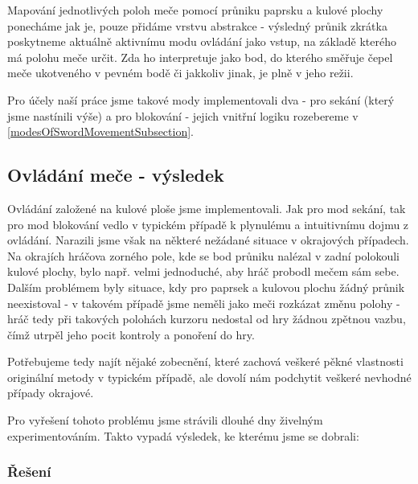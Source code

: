 Mapování jednotlivých poloh meče pomocí průniku paprsku a kulové plochy ponecháme jak je, pouze přidáme vrstvu abstrakce - výsledný průnik zkrátka poskytneme aktuálně aktivnímu modu ovládání jako vstup, na základě kterého má polohu meče určit. Zda ho interpretuje jako bod, do kterého směřuje čepel meče ukotveného v pevném bodě či jakkoliv jinak, je plně v jeho režii.

Pro účely naší práce jsme takové mody implementovali dva - pro sekání (který jsme nastínili výše) a pro blokování - jejich vnitřní logiku rozebereme v \ref{modesOfSwordMovementSubsection}.


\subsection{Ovládání meče - výsledek}

Ovládání založené na kulové ploše jsme implementovali. Jak pro mod sekání, tak pro mod blokování vedlo v typickém případě k plynulému a intuitivnímu dojmu z ovládání. Narazili jsme však na některé nežádané situace v okrajových případech. Na okrajích hráčova zorného pole, kde se bod průniku nalézal v zadní polokouli kulové plochy, bylo např. velmi jednoduché, aby hráč probodl mečem sám sebe. Dalším problémem byly situace, kdy pro paprsek a kulovou plochu žádný průnik neexistoval - v takovém případě jsme neměli jako meči rozkázat změnu polohy - hráč tedy při takových polohách kurzoru nedostal od hry žádnou zpětnou vazbu, čímž utrpěl jeho pocit kontroly a ponoření do hry.

Potřebujeme tedy najít nějaké zobecnění, které zachová veškeré pěkné vlastnosti originální metody v typickém případě, ale dovolí nám podchytit veškeré nevhodné případy okrajové.

Pro vyřešení tohoto problému jsme strávili dlouhé dny živelným experimentováním. Takto vypadá výsledek, ke kterému jsme se dobrali:

\subsubsection*{Řešení}

